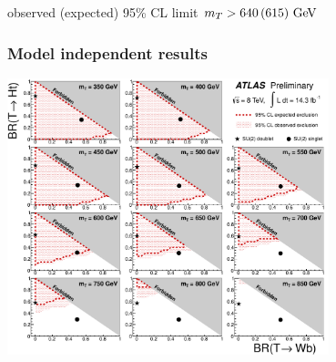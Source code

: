 \begin{frame}
\begin{minipage}{.5\textwidth}
observed (expected) 95\%  CL  limit  $m_{\T}>640\,(615)\gev$

\end{minipage}

\end{frame}

\begin{frame}\frametitle{Model independent results}
\centering\footnotesize

\includegraphics[width=0.7\textwidth]{pics/lim_2D}

\end{frame}




